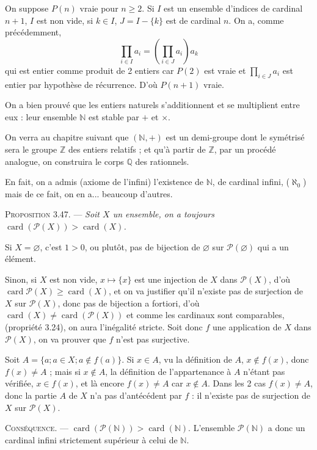 On suppose $P(n)$ vraie pour $n\ge2$. Si $I$ est un ensemble d'indices de cardinal $n+1$, $I$ est non vide, si $k\in I$, $J=I-\{k\}$ est de cardinal $n$. On a, comme précédemment,
\[
\prod_{i\in I}a_i=\left(\prod_{i\in J}a_i\right)a_k
\]
qui est entier comme produit de 2 entiers car $P(2)$ est vraie et $\prod_{i\in J}a_i$ est entier par hypothèse de récurrence. D'où $P(n+1)$ vraie.

On a bien prouvé que les entiers naturels s'additionnent et se multiplient entre eux : leur ensemble $\mathbb N$ est stable par $+$ et $\times$. \bookend

On verra au chapitre suivant que $(\mathbb N,+)$ est un demi-groupe dont le symétrisé sera le groupe $\mathbb Z$ des entiers relatifs ; et qu'à partir de $\mathbb Z$, par un procédé analogue, on construira le corps $\mathbb Q$ des rationnels.


En fait, on a admis (axiome de l'infini) l'existence de $\mathbb N$, de cardinal infini, ($\aleph_0$) mais de ce fait, on en a... beaucoup d'autres.

\medskip\noindent\textsc{Proposition 3.47.} --- \emph{Soit $X$ un ensemble, on a toujours $\operatorname{card}(\mathcal P(X))>\operatorname{card}(X)$.}

Si $X=\varnothing$, c'est $1>0$, ou plutôt, pas de bijection de $\varnothing$ sur $\mathcal P(\varnothing)$ qui a un élément.

Sinon, si $X$ est non vide, $x\mapsto\{x\}$ est une injection de $X$ dans $\mathcal P(X)$, d'où $\operatorname{card}\mathcal P(X)\ge\operatorname{card}(X)$, et on va justifier qu'il n'existe pas de surjection de $X$ sur $\mathcal P(X)$, donc pas de bijection a fortiori, d'où $\operatorname{card}(X)\ne\operatorname{card}(\mathcal P(X))$ et comme les cardinaux sont comparables, (propriété 3.24), on aura l'inégalité stricte. Soit donc $f$ une application de $X$ dans $\mathcal P(X)$, on va prouver que $f$ n'est pas surjective.

Soit $A=\{a;a\in X; a\notin f(a)\}$. Si $x\in A$, vu la définition de $A$, $x\notin f(x)$, donc $f(x)\ne A$ ; mais si $x\notin A$, la définition de l'appartenance à $A$ n'étant pas vérifiée, $x\in f(x)$, et là encore $f(x)\ne A$ car $x\notin A$. Dans les 2 cas $f(x)\ne A$, donc la partie $A$ de $X$ n'a pas d'antécédent par $f$ : il n'existe pas de surjection de $X$ sur $\mathcal P(X)$. \bookend

\medskip\noindent\textsc{Conséquence.} --- $\operatorname{card}(\mathcal P(\mathbb N))>\operatorname{card}(\mathbb N)$. L'ensemble $\mathcal P(\mathbb N)$ a donc un cardinal infini strictement supérieur à celui de $\mathbb N$. 


